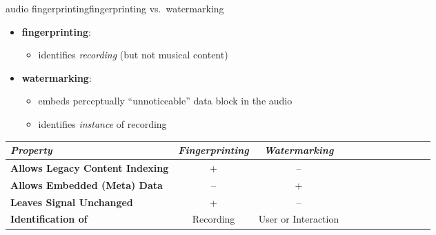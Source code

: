         \begin{frame}{audio fingerprinting}{fingerprinting vs.\ watermarking}
            \begin{itemize}
                \item	\textbf{fingerprinting}:
                    \begin{itemize}
                        \item identifies \textit{recording} (but not musical content)
                    \end{itemize}
                \item	\textbf{watermarking}:
                    \begin{itemize}
                        \item embeds perceptually ``unnoticeable'' data block in the audio
                        \item   identifies \textit{instance} of recording
                    \end{itemize}
            \end{itemize}
            \pause
            \begin{footnotesize}
                \begin{table}
                    \centering
                    \begin{tabular}{lccccccccccc} %
                        \\ \hline
                        \bf{\emph{Property}}	 & \bf{\emph{Fingerprinting}}	 & \bf{\emph{Watermarking}}\\ 
                         \hline
                        \bf{Allows Legacy Content Indexing}	 & +	 & --\\
                        \bf{Allows Embedded (Meta) Data}	 & --	 & +\\
                        \bf{Leaves Signal Unchanged}	 & +	 & --\\
                        \bf{Identification of}	 & Recording	 & User or Interaction\\
                    \end{tabular}
                \end{table}
            \end{footnotesize}
        \end{frame}

